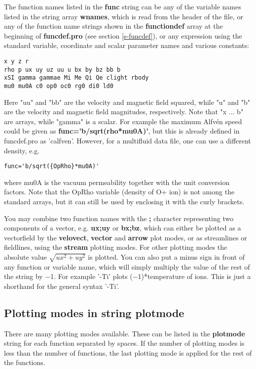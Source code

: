 \documentclass{article}
\begin{document}
   The function names listed in the {\bf func} string can be any of 
   the variable names listed in the string array {\bf wnames}, which is 
   read from the header of the file, or any of the function name strings 
   shown in the {\bf functiondef} array at the beginning of
   {\bf funcdef.pro} (see section \ref{s-funcdef}), 
   or any expression using the standard variable, 
   coordinate and scalar parameter names and various constants:
\begin{verbatim}
x y z r
rho p ux uy uz uu u bx by bz bb b
xSI gamma gammae Mi Me Qi Qe clight rbody
mu0 mu0A c0 op0 oc0 rg0 di0 ld0
\end{verbatim}
   Here "uu" and "bb" are the velocity and magnetic field squared, while
   "u" and "b" are the velocity and magnetic field magnitudes, 
   respectively. Note that "x ... b" are arrays, while  "gamma" is
   a scalar.  For example the maximum Alfv\'en 
   speed could be given as {\bf func='b/sqrt(rho*mu0A)'}, but this is already 
   defined in funcdef.pro as 'calfven'. However, for a multifluid data
   file, one can use a different density, e.g. 
\begin{verbatim}
func='b/sqrt({OpRho}*mu0A)'
\end{verbatim}
   where mu0A is the vacuum permeability together with the unit conversion
   factors.
   Note that the OpRho variable (density of O+ ion) is not among the standard
   arrays, but it can still be used by enclosing it with the curly brackets.

   You may combine two function names with the {\bf ;} character representing
   two components of a vector, 
   e.g. {\bf ux;uy} or {\bf bx;bz}, which can either be plotted as a 
   vectorfield by the {\bf velovect}, {\bf vector} and {\bf arrow} plot modes, 
   or as streamlines or fieldlines, using the {\bf stream} plotting modes.
   For other plotting modes the absolute value
   $\sqrt{ux^2+uy^2}$ is plotted.
   You can also put a minus sign in front of any function or variable
   name, which will simply multiply the value of the rest of the string by $-$1. 
   For example '-Ti' plots ($-$1)*temperature of ions. This is just a shorthand for
   the general syntax '-{Ti}'.

\subsection{Plotting modes in string plotmode \label{s-plotmode}}

There are many plotting modes available. 
These can be listed in the {\bf plotmode} string for each function separated 
by spaces. If the number of plotting modes is less than the number of functions,
the last plotting mode is applied for the rest of the functions.
\end{document}
